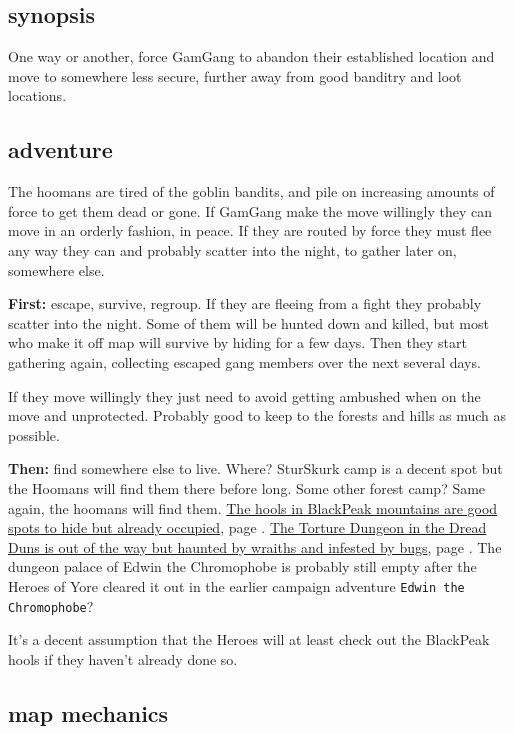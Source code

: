 \subsection*{synopsis}

One way or another, force GamGang to abandon their established location and move to somewhere less secure, further away from good banditry and loot locations.


\subsection*{adventure}

The hoomans are tired of the goblin bandits, and pile on increasing amounts of force to get them dead or gone. If GamGang make the move willingly they can move in an orderly fashion, in peace. If they are routed by force they must flee any way they can and probably scatter into the night, to gather later on, somewhere else.

\textbf{First:} escape, survive, regroup. If they are fleeing from a fight they probably scatter into the night. Some of them will be hunted down and killed, but most who make it off map will survive by hiding for a few days. Then they start gathering again, collecting escaped gang members over the next several days.

If they move willingly they just need to avoid getting ambushed when on the move and unprotected. Probably good to keep to the forests and hills as much as possible.

\textbf{Then:} find somewhere else to live. Where? SturSkurk camp is a decent spot but the Hoomans will find them there before long. Some other forest camp? Same again, the hoomans will find them. 
\hyperref[appendixmountaingoblins]{The hools in BlackPeak mountains are good spots to hide but already occupied}, page \pageref{appendixmountaingoblins}. 
\hyperref[appendixtorturedungeon]{The Torture Dungeon in the Dread Duns is out of the way but haunted by wraiths and infested by bugs}, page \pageref{appendixtorturedungeon}. 
The dungeon palace of Edwin the Chromophobe is probably still empty after the Heroes of Yore cleared it out in the earlier campaign adventure \texttt{Edwin the Chromophobe}?

It's a decent assumption that the Heroes will at least check out the BlackPeak hools if they haven't already done so. 


\subsection*{map mechanics}

